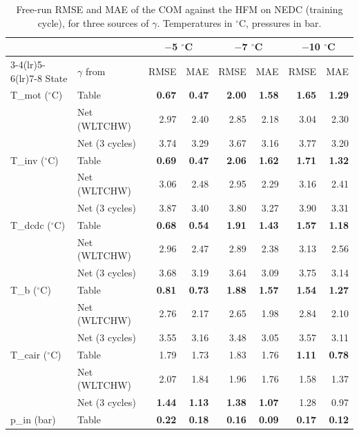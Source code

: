 \begin{table}[t]
\centering
\caption{Free-run RMSE and MAE of the COM against the HFM on NEDC (training cycle), for three sources of $\gamma$. Temperatures in $^\circ$C, pressures in bar.}
\label{tab:freerun_nedc}
\small
\begin{tabular}{llrrrrrr}
\toprule
 & & \multicolumn{2}{c}{$-$5 $^\circ$C} & \multicolumn{2}{c}{$-$7 $^\circ$C} & \multicolumn{2}{c}{$-$10 $^\circ$C} \\
\cmidrule(lr){3-4}\cmidrule(lr){5-6}\cmidrule(lr){7-8}
State & $\gamma$ from & RMSE & MAE & RMSE & MAE & RMSE & MAE \\
\midrule
T\_mot ($^\circ$C) & Table & \textbf{0.67} & \textbf{0.47} & \textbf{2.00} & \textbf{1.58} & \textbf{1.65} & \textbf{1.29} \\
 & Net (WLTCHW) & 2.97 & 2.40 & 2.85 & 2.18 & 3.04 & 2.30 \\
 & Net (3 cycles) & 3.74 & 3.29 & 3.67 & 3.16 & 3.77 & 3.20 \\
\addlinespace
T\_inv ($^\circ$C) & Table & \textbf{0.69} & \textbf{0.47} & \textbf{2.06} & \textbf{1.62} & \textbf{1.71} & \textbf{1.32} \\
 & Net (WLTCHW) & 3.06 & 2.48 & 2.95 & 2.29 & 3.16 & 2.41 \\
 & Net (3 cycles) & 3.87 & 3.40 & 3.80 & 3.27 & 3.90 & 3.31 \\
\addlinespace
T\_dcdc ($^\circ$C) & Table & \textbf{0.68} & \textbf{0.54} & \textbf{1.91} & \textbf{1.43} & \textbf{1.57} & \textbf{1.18} \\
 & Net (WLTCHW) & 2.96 & 2.47 & 2.89 & 2.38 & 3.13 & 2.56 \\
 & Net (3 cycles) & 3.68 & 3.19 & 3.64 & 3.09 & 3.75 & 3.14 \\
\addlinespace
T\_b ($^\circ$C) & Table & \textbf{0.81} & \textbf{0.73} & \textbf{1.88} & \textbf{1.57} & \textbf{1.54} & \textbf{1.27} \\
 & Net (WLTCHW) & 2.76 & 2.17 & 2.65 & 1.98 & 2.84 & 2.10 \\
 & Net (3 cycles) & 3.55 & 3.16 & 3.48 & 3.05 & 3.57 & 3.11 \\
\addlinespace
T\_cair ($^\circ$C) & Table & 1.79 & 1.73 & 1.83 & 1.76 & \textbf{1.11} & \textbf{0.78} \\
 & Net (WLTCHW) & 2.07 & 1.84 & 1.96 & 1.76 & 1.58 & 1.37 \\
 & Net (3 cycles) & \textbf{1.44} & \textbf{1.13} & \textbf{1.38} & \textbf{1.07} & 1.28 & 0.97 \\
\addlinespace
p\_in (bar) & Table & \textbf{0.22} & \textbf{0.18} & \textbf{0.16} & \textbf{0.09} & \textbf{0.17} & \textbf{0.12} \\

\end{tabular}
\end{table}

